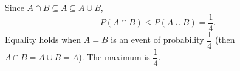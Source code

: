 Since $A\cap B\subseteq A\subseteq A\cup B$,
\[
P(A\cap B)\le P(A\cup B)=\dfrac{1}{4} .
\]
Equality holds when $A=B$ is an event of probability $\dfrac{1}{4}$ (then $A\cap B=A\cup B=A$). The maximum is $\boxed{\dfrac{1}{4}}$.
